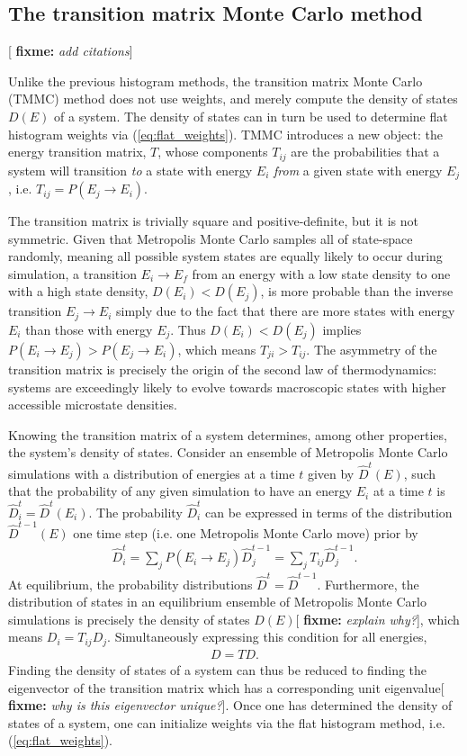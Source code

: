 \documentclass[11pt]{article}
\newcommand{\p}[1]{\left(#1\right)} %
\newcommand{\red}[1]{{\bf \color{red} #1}}
\newcommand{\fixme}[1]{[\red{fixme:} \emph{#1}]}
\begin{document}
\subsection{The transition matrix Monte Carlo method}
\label{sec:tmmc}

\fixme{add citations}

Unlike the previous histogram methods, the transition matrix Monte
Carlo (TMMC) method does not use weights, and merely compute the
density of states $D\p{E}$ of a system\cite{tmmc}. The density of
states can in turn be used to determine flat histogram weights via
(\ref{eq:flat_weights}). TMMC introduces a new object: the energy
transition matrix, $T$, whose components $T_{ij}$ are the
probabilities that a system will transition {\it to} a state with
energy $E_i$ {\it from} a given state with energy $E_j$,
i.e. $T_{ij}=P\p{E_j\to E_i}$.

The transition matrix is trivially square and positive-definite, but
it is not symmetric. Given that Metropolis Monte Carlo samples all of
state-space randomly, meaning all possible system states are equally
likely to occur during simulation, a transition $E_i\to E_f$ from an
energy with a low state density to one with a high state density,
$D\p{E_i}<D\p{E_j}$, is more probable than the inverse transition
$E_j\to E_i$ simply due to the fact that there are more states with
energy $E_i$ than those with energy $E_j$. Thus $D\p{E_i}<D\p{E_j}$
implies $P\p{E_i\to E_j}>P\p{E_j\to E_i}$, which means
$T_{ji}>T_{ij}$. The asymmetry of the transition matrix is precisely
the origin of the second law of thermodynamics: systems are
exceedingly likely to evolve towards macroscopic states with higher
accessible microstate densities.

Knowing the transition matrix of a system determines, among other
properties, the system's density of states. Consider an ensemble of
Metropolis Monte Carlo simulations with a distribution of energies at
a time $t$ given by $\hat D^{t}\p{E}$, such that the probability of
any given simulation to have an energy $E_i$ at a time $t$ is $\hat
D_i^{t}=\hat D^{t}\p{E_i}$. The probability $\hat D_i^{t}$ can be
expressed in terms of the distribution $\hat D^{t-1}\p{E}$ one time
step (i.e. one Metropolis Monte Carlo move) prior by
\begin{align}
  \hat D_i^{t}=\sum_jP\p{E_i\to E_j}\hat D_j^{t-1} =\sum_j T_{ij}\hat
  D_j^{t-1}.
  \label{eq:transition_evolution}
\end{align}
At equilibrium, the probability distributions $\hat D^{t}=\hat
D^{t-1}$. Furthermore, the distribution of states in an equilibrium
ensemble of Metropolis Monte Carlo simulations is precisely the
density of states $D\p{E}$\fixme{explain why?}, which means
$D_i=T_{ij}D_j$. Simultaneously expressing this condition for all
energies,
\begin{align}
  D=TD. \label{eq:dos_eigen}
\end{align}
Finding the density of states of a system can thus be reduced to
finding the eigenvector of the transition matrix which has a
corresponding unit eigenvalue\fixme{why is this eigenvector
  unique?}. Once one has determined the density of states of a system,
one can initialize weights via the flat histogram method,
i.e. (\ref{eq:flat_weights}).
\end{document}

